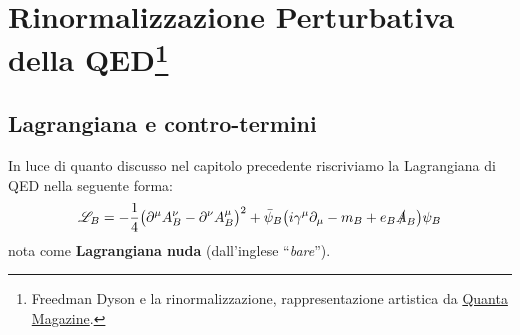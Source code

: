 \documentclass[../main.tex]{subfiles}
\begin{document}
\setchapterpreamble[u]{\margintoc}
\chapter[Rinormalizzazione Perturbativa della QED]{Rinormalizzazione Perturbativa della QED\footnote{Freedman Dyson e la rinormalizzazione, rappresentazione artistica da \href{https://youtu.be/qe7atm1x6Mg}{Quanta Magazine}.}}
\fboxsep =1pt %

\section{Lagrangiana e contro-termini}
In luce di quanto discusso nel capitolo precedente riscriviamo la Lagrangiana di QED nella seguente forma:
\begin{equation}
    \mathscr L_B = -\frac{1}{4}\bigl( \partial^\mu A_B^\nu - \partial^\nu A_B^\mu \bigr)^2 + \bar \psi_B\bigl( i\gamma^\mu\partial_\mu - m_B + e_B\slashed{A}_B\bigr)\psi_B
    \label{eq:bare_lagrangian_QED}
\end{equation}
nota come \textbf{Lagrangiana nuda} (dall'inglese “\textit{bare}”).
\end{document}
